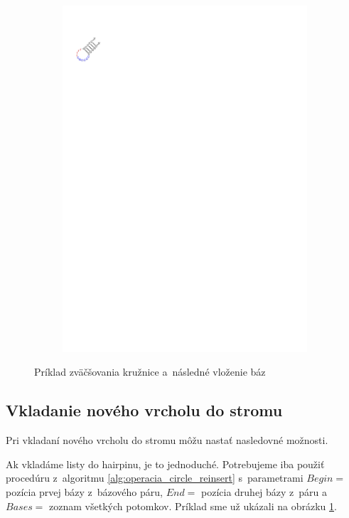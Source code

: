 \begin{figure}
\begin{subfigure}{\wi}
    \includegraphics[trim=1cm 24.5cm 17.5cm 2.5cm]{../img/alg/insert/1/circle-big-end}
  \end{subfigure}

  \caption{Príklad zväčšovania kružnice a~následné vloženie báz}
  \label{obr:insert_circle_hairpin}
\end{figure}





\subsection{Vkladanie nového vrcholu do stromu}

Pri vkladaní nového vrcholu do stromu môžu nastať nasledovné možnosti.

Ak vkladáme listy do hairpinu, je to jednoduché. Potrebujeme iba použiť
procedúru z~algoritmu \ref{alg:operacia_circle_reinsert}
s~parametrami $Begin = $ pozícia prvej bázy z~bázového páru, $End = $ pozícia
druhej bázy z~páru a~$Bases = $ zoznam všetkých potomkov.
Príklad sme už ukázali na obrázku \ref{obr:insert_circle_hairpin}.

